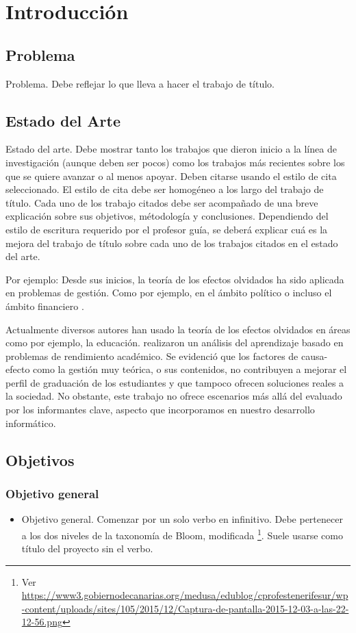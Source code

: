 \chapter{Introducción}
\section{Problema}
Problema. Debe reflejar lo que lleva a hacer el trabajo de título.

\section{Estado del Arte}
Estado del arte. Debe mostrar tanto los trabajos que dieron inicio a la línea de investigación (aunque deben ser pocos) como los trabajos más recientes sobre los que se quiere avanzar o al menos apoyar. Deben citarse usando el estilo de cita seleccionado. El estilo de cita debe ser homogéneo a los largo del trabajo de título. Cada uno de los trabajo citados debe ser acompañado de una breve explicación sobre sus objetivos, métodología y conclusiones. Dependiendo del estilo de escritura requerido por el profesor guía, se deberá explicar cuá es la mejora del trabajo de título sobre cada uno de los trabajos citados en el estado del arte.

Por ejemplo: Desde sus inicios, la teoría de los efectos olvidados ha sido aplicada en problemas de gestión. Como por ejemplo, en el ámbito político \parencite[105-126]{kaufmann1988modelos} o incluso el ámbito financiero \parencite[127-151]{kaufmann1988modelos}. 

Actualmente diversos autores han usado la teoría de los efectos olvidados en áreas como por ejemplo, la educación. \textcite{cabrera2020analysis} realizaron un análisis del aprendizaje basado en problemas de rendimiento académico. Se evidenció que los factores de causa-efecto como la gestión muy teórica, o sus contenidos, no contribuyen a mejorar el perfil de graduación de los estudiantes y que tampoco ofrecen soluciones reales a la sociedad. No obstante, este trabajo no ofrece escenarios más allá del evaluado por los informantes clave, aspecto que incorporamos en nuestro desarrollo informático.  \\

\section{Objetivos}
\subsection{Objetivo general}
\begin{itemize} 
    \item Objetivo general. Comenzar por un solo verbo en infinitivo. Debe pertenecer a los dos niveles de la taxonomía de Bloom, modificada \textcite{anderson2001taxonomy} \footnote{Ver \url{https://www3.gobiernodecanarias.org/medusa/edublog/cprofestenerifesur/wp-content/uploads/sites/105/2015/12/Captura-de-pantalla-2015-12-03-a-las-22-12-56.png}}. Suele usarse como título del proyecto sin el verbo.
\end{itemize}
